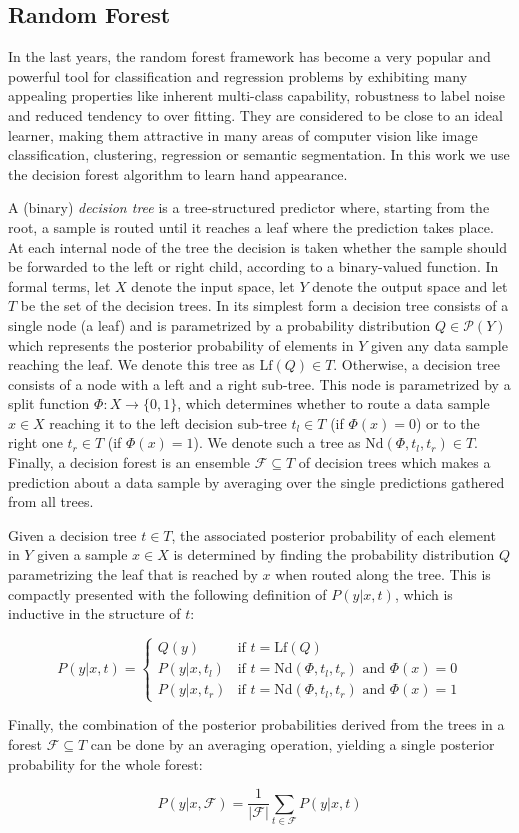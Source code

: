 \subsection{Random Forest}
\label{random_forest}
In the last years, the random forest framework has become a very popular
and powerful tool for classification and regression problems by exhibiting
many appealing properties like inherent multi-class capability, robustness
to label noise and reduced tendency to over fitting. They are considered
to be close to an ideal learner, making them attractive in many areas
of computer vision like image classification, clustering, regression
or semantic segmentation. In this work we use the decision forest
algorithm to learn hand appearance.

A (binary) \emph{decision tree} is a tree-structured predictor where,
starting from the root, a sample is routed until it reaches a leaf
where the prediction takes place. At each internal node of the tree
the decision is taken whether the sample should be forwarded to the
left or right child, according to a binary-valued function. In formal
terms, let $X$ denote the input space, let $Y$ denote the output
space and let $T$ be the set of the decision trees. In its simplest
form a decision tree consists of a single node (a leaf) and is parametrized
by a probability distribution $Q\in\mathcal{P}(Y)$ which represents
the posterior probability of elements in $Y$ given any data sample
reaching the leaf. We denote this tree as $\text{Lf}(Q)\in T$. Otherwise,
a decision tree consists of a node with a left and a right sub-tree.
This node is parametrized by a split function $\Phi:X\rightarrow\{0,1\}$,
which determines whether to route a data sample $x\in X$ reaching
it to the left decision sub-tree $t_{l}\in T$ (if $\Phi(x)=0$) or
to the right one $t_{r}\in T$ (if $\Phi(x)=1$). We denote such a
tree as $\text{Nd}(\Phi,t_{l},t_{r})\in T$. Finally, a decision forest
is an ensemble $\mathcal{F}\subseteq T$ of decision trees which makes
a prediction about a data sample by averaging over the single predictions
gathered from all trees.

Given a decision tree $t\in T$, the associated posterior probability
of each element in $Y$ given a sample $x\in X$ is determined by
finding the probability distribution $Q$ parametrizing the leaf that
is reached by $x$ when routed along the tree. This is compactly presented
with the following definition of $P(y|x,t)$, which is inductive in
the structure of $t$:

\[
P(y|x,t)=\left\{ \begin{array}{rl}
Q(y) & \text{if }t=\text{Lf}(Q)\\
P(y|x,t_{l}) & \text{if }t=\text{Nd}(\Phi,t_{l},t_{r})\text{ and }\Phi(x)=0\\
P(y|x,t_{r}) & \text{if }t=\text{Nd}(\Phi,t_{l},t_{r})\text{ and }\Phi(x)=1
\end{array}\right.
\]


Finally, the combination of the posterior probabilities derived from
the trees in a forest $\mathcal{F}\subseteq T$ can be done by an
averaging operation, yielding a single posterior probability for the
whole forest:

\[
P(y|x,\mathit{\mathcal{F}})=\frac{1}{|\mathcal{F}|}\sum_{t\in\mathcal{F}}P(y|x,t)
\]